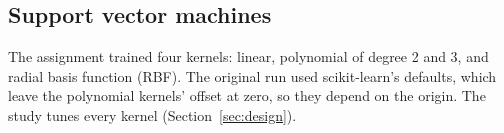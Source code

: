 \subsection{Support vector machines}

The assignment trained four kernels: linear, polynomial of degree 2 and 3, and radial basis function (RBF). The original run used scikit-learn's defaults, which leave the polynomial kernels' offset at zero, so they depend on the origin. The study tunes every kernel (Section~\ref{sec:design}).
